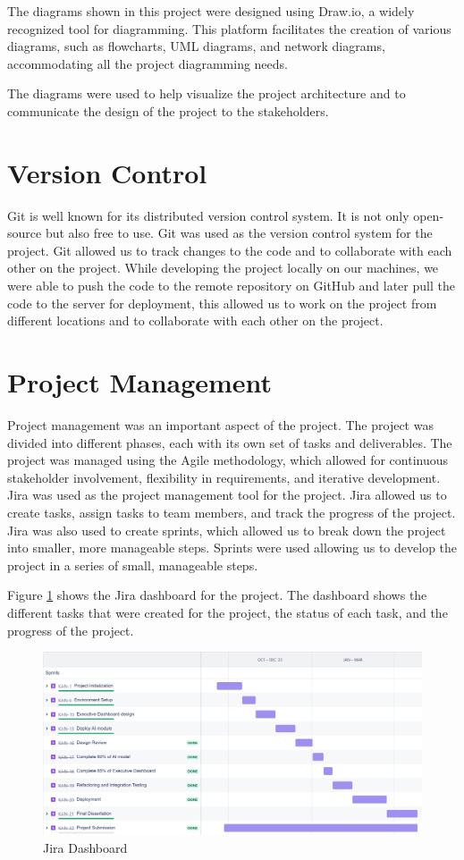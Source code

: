 The diagrams shown in this project were designed using Draw.io, a widely recognized tool for diagramming. This platform facilitates the creation of various 
diagrams, such as flowcharts, UML diagrams, and network diagrams, accommodating all the project diagramming needs.

The diagrams were used to help visualize the project architecture and to communicate the design of the
project to the stakeholders.

\section{Version Control}


Git is well known for its distributed version control system. It is not only open-source but also free to use.
Git was used as the version control system for the project. Git allowed us to track changes to the code and to collaborate with each other on the project.
While developing the project locally on our machines, we were able to push the code to the remote repository on GitHub and later pull the code to the server
for deployment, this allowed us to work on the project from different locations and to collaborate with each other on the project.

\section{Project Management}

Project management was an important aspect of the project. The project was divided into different phases, each with its own set of tasks and deliverables.
The project was managed using the Agile methodology, which allowed for continuous stakeholder involvement, flexibility in requirements, and iterative development.
Jira was used as the project management tool for the project. Jira allowed us to create tasks, assign tasks to team members, and track the progress of the project.
Jira was also used to create sprints, which allowed us to break down the project into smaller, more manageable steps. Sprints were used allowing us to develop 
the project in a series of small, manageable steps.

Figure \ref{fig:jira} shows the Jira dashboard for the project. The dashboard shows the different tasks that were created for the project, the status of each task, 
and the progress of the project. 

\begin{figure}[H]
    \centering
    \includegraphics[width=1.0\linewidth]{images/jira}
    \caption{Jira Dashboard}
    \label{fig:jira}
\end{figure}
